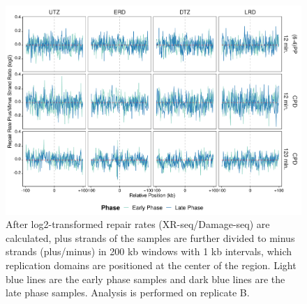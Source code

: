 \begin{figure}[H]
\begin{center}
\includegraphics[width=\textwidth]{Chapters/7_appendix/figures/supfig33}
\caption[Repair rate plus/minus phase ratio of replication domains in 200 kb (replicate B).]{After log2-transformed repair rates (XR-seq/Damage-seq) are calculated, plus strands of the samples are further divided to minus strands (plus/minus) in 200 kb windows with 1 kb intervals, which replication domains are positioned at the center of the region. Light blue lines are the early phase samples and dark blue lines are the late phase samples. Analysis is performed on replicate B.}
\label{supfig:rrpm200repdomainB}
\end{center}
\end{figure}

